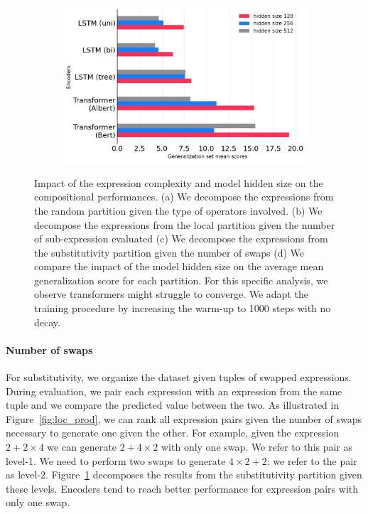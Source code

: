 \begin{figure}[htb!]
\begin{subfigure}[b]{7.52cm}
        \caption{}
        \label{subfig:substitutivity-study}
    \end{subfigure}
    \hfill
    \begin{subfigure}[b]{7.52cm}
        \centering 
        \includegraphics[width=\textwidth]{images/hidden-size-study_v2.png}
        \caption{}
        \label{subfig:hidden-size}
    \end{subfigure}
    \caption{Impact of the expression complexity and model hidden size on the compositional performances. (a) We decompose the expressions from the random partition given the type of operators involved. (b) We decompose the expressions from the local partition given the number of sub-expression evaluated (c) We decompose the expressions from the substitutivity partition given the number of swaps (d) We compare the impact of the model hidden size on the average mean generalization score for each partition. For this specific analysis, we observe transformers might struggle to converge. We adapt the training procedure by increasing the warm-up to 1000 steps with no decay.}
\end{figure}

\paragraph{Number of swaps} For substitutivity, we organize the dataset given tuples of swapped expressions. During evaluation, we pair each expression with an expression from the same tuple and we compare the predicted value between the two. As illustrated in Figure~\ref{fig:loc_prod}, we can rank all expression pairs given the number of swaps necessary to generate one given the other. For example, given the expression $2 + 2 \times 4$ we can generate $2 + 4 \times 2$ with only one swap. We refer to this pair as level-1. We need to perform two swaps to generate $4 \times 2 + 2$: we refer to the pair as level-2. Figure~\ref{subfig:substitutivity-study} decomposes the results from the substitutivity partition given these levels. Encoders tend to reach better performance for expression pairs with only one swap. 

